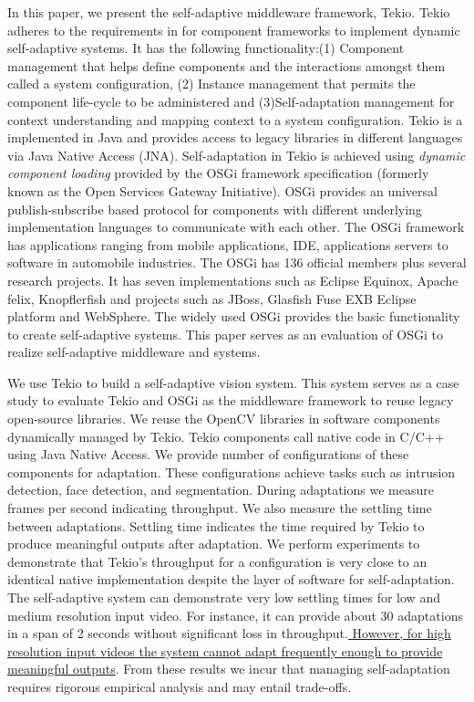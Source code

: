 \documentclass{acm_proc_article-sp}
\begin{document}
In this paper, we present the self-adaptive middleware framework, Tekio. Tekio adheres to the requirements in  \cite{Hallsteinsen2006} for component frameworks to implement dynamic self-adaptive systems. It has the following functionality:(1) Component management that helps define components and the interactions amongst them called a system configuration, (2) Instance management that permits the component life-cycle to be administered and (3)Self-adaptation management for context understanding and mapping context to a system configuration. Tekio is a implemented in Java and provides access to legacy libraries in different languages via Java Native Access (JNA). Self-adaptation in Tekio is achieved using \emph{dynamic component loading}  provided by the  OSGi framework specification (formerly known as the Open Services Gateway Initiative). OSGi provides an universal publish-subscribe based protocol for components with different underlying implementation languages to communicate with each other. The OSGi framework has applications ranging from mobile applications, IDE, applications servers to software in automobile industries. The OSGi has 136 official members plus several research projects. It has seven implementations such as Eclipse Equinox, Apache felix, Knopflerfish and projects such as JBoss, Glasfish Fuse EXB Eclipse platform and WebSphere. The widely used OSGi provides the basic functionality to create self-adaptive systems. This paper serves as an evaluation of OSGi to realize self-adaptive middleware and systems.

We use Tekio to build a self-adaptive vision system. This system serves as a case study to evaluate Tekio and OSGi as the middleware framework to reuse legacy open-source libraries. We reuse the OpenCV libraries \cite{Zelinsky2009} in software components dynamically managed by Tekio. Tekio components call native code in C/C++ using Java Native Access. We provide number of configurations of these components for adaptation. These configurations achieve tasks such as intrusion detection, face detection, and segmentation. During adaptations we measure frames per second indicating throughput. We also measure the settling time between adaptations. Settling time indicates the time required by Tekio to produce meaningful outputs after adaptation. We perform experiments to demonstrate that Tekio's throughput for a configuration is very close to an identical native implementation despite the layer of software for self-adaptation. The self-adaptive system can demonstrate very low settling times for low and medium resolution input video. For instance, it can provide about 30 adaptations in a span of 2 seconds without significant loss in throughput.\underline{ However, for high resolution input videos the system cannot adapt frequently enough to provide meaningful outputs}. From these results we incur that managing self-adaptation requires rigorous empirical analysis and may entail trade-offs.
\end{document}
